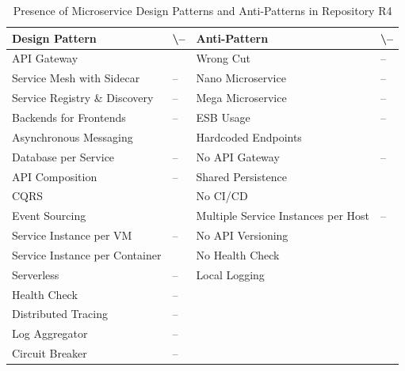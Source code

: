 \documentclass{Configuration_Files/PoliMi3i_thesis}
\newcommand{\cmark}{\ding{51}}%
\begin{document}
\begin{table}[H]
\centering 
    \begin{tabular}{ 
  | >{\centering\arraybackslash} m{16em} 
  | >{\centering\arraybackslash} m{2.2em} 
  | >{\centering\arraybackslash} m{16em} 
  | >{\centering\arraybackslash} m{2.2em} | }
    \hline
    \rowcolor{bluepoli!40}
    \textbf{Design Pattern} & \cmark \textbackslash – & \textbf{Anti-Pattern} & \cmark \textbackslash – \T\B \\
    \hline \hline
    API Gateway & \cmark & Wrong Cut & – \T\B\\
    \hline
    \rowcolor{bluepoli!10}
    Service Mesh with Sidecar & – & Nano Microservice & – \T\B \\
    \hline
    Service Registry \& Discovery & – & Mega Microservice & – \T\B \\
    \hline
    \rowcolor{bluepoli!10}
    Backends for Frontends & – & ESB Usage & – \T\B \\
    \hline
    Asynchronous Messaging & \cmark & Hardcoded Endpoints & \cmark \T\B \\
    \hline
    \rowcolor{bluepoli!10}
    Database per Service & – & No API Gateway & – \T\B \\
    \hline
    API Composition & – & Shared Persistence & \cmark \T\B \\
    \hline
    \rowcolor{bluepoli!10}
    CQRS & \cmark & No CI/CD & \cmark \T\B \\
    \hline
    Event Sourcing & \cmark & Multiple Service Instances per Host & – \T\B \\
    \hline
    \rowcolor{bluepoli!10}
    Service Instance per VM & – & No API Versioning & \cmark \T\B \\
    \hline
    Service Instance per Container & \cmark & No Health Check & \cmark \T\B \\
    \hline
    \rowcolor{bluepoli!10}
    Serverless & – & Local Logging & \cmark \T\B \\
    \hline
    Health Check & – &  & \T\B \\
    \hline
    \rowcolor{bluepoli!10}
    Distributed Tracing & – & & \T\B \\
    \hline
    Log Aggregator & – &  & \T\B \\
    \hline
    \rowcolor{bluepoli!10}
    Circuit Breaker & – &  & \T\B \\
    \hline
    \end{tabular}
    \\[10pt]
    \caption{Presence of Microservice Design Patterns and Anti-Patterns in Repository R4}
    \label{table:R4_result}
\end{table}
\end{document}
